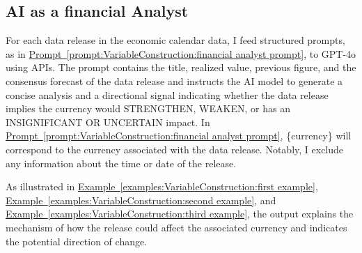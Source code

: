 \documentclass[12pt,oneside,letter]{article}
\newcommand*{\myprp}[1]{\hyperref[{#1}]{Prompt~\ref*{#1}}}
\newcommand*{\myexmpl}[1]{\hyperref[{#1}]{Example~\ref*{#1}}}
\begin{document}
		\subsection{AI as a financial Analyst}   \label{sec:ChatGPT as a financial Analyst} 
		For each data release in the economic calendar data, I feed structured prompts, as in \myprp{prompt:VariableConstruction:financial analyst prompt}, to GPT-4o using APIs. The prompt contains the title, realized value, previous figure, and the consensus forecast of the data release and instructs the AI model to generate a concise analysis and a directional signal indicating whether the data release implies the currency would STRENGTHEN, WEAKEN, or has an INSIGNIFICANT OR UNCERTAIN impact. In \myprp{prompt:VariableConstruction:financial analyst prompt}, \{currency\} will correspond to the currency associated with the data release. Notably, I exclude any information about the time or date of the release.
		\begin{prompt}[H] 
			\centering
			\caption{}
			\label{prompt:VariableConstruction:financial analyst prompt}
		\end{prompt}
		\vspace{-20pt}As illustrated in \myexmpl{examples:VariableConstruction:first example}, \myexmpl{examples:VariableConstruction:second example}, and \myexmpl{examples:VariableConstruction:third example}, the output explains the mechanism of how the release could affect the associated currency and indicates the potential direction of change.
		\begin{examples}[H] 
			\centering
			\caption{}
			\label{examples:VariableConstruction:first example}
		\end{examples}
\end{document}

